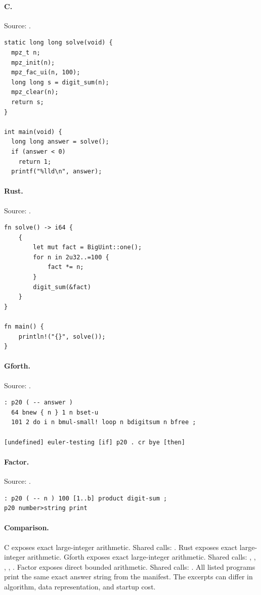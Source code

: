 \paragraph{C.} Source: .
\begin{lstlisting}
static long long solve(void) {
  mpz_t n;
  mpz_init(n);
  mpz_fac_ui(n, 100);
  long long s = digit_sum(n);
  mpz_clear(n);
  return s;
}

int main(void) {
  long long answer = solve();
  if (answer < 0)
    return 1;
  printf("%lld\n", answer);
\end{lstlisting}

\paragraph{Rust.} Source: .
\begin{lstlisting}
fn solve() -> i64 {
    {
        let mut fact = BigUint::one();
        for n in 2u32..=100 {
            fact *= n;
        }
        digit_sum(&fact)
    }
}

fn main() {
    println!("{}", solve());
}
\end{lstlisting}

\paragraph{Gforth.} Source: .
\begin{lstlisting}
: p20 ( -- answer )
  64 bnew { n } 1 n bset-u
  101 2 do i n bmul-small! loop n bdigitsum n bfree ;

[undefined] euler-testing [if] p20 . cr bye [then]
\end{lstlisting}

\paragraph{Factor.} Source: .
\begin{lstlisting}
: p20 ( -- n ) 100 [1..b] product digit-sum ;
p20 number>string print
\end{lstlisting}

\paragraph{Comparison.}
C exposes exact large-integer arithmetic. Shared calls: \texttt{}. Rust exposes exact large-integer arithmetic. Gforth exposes exact large-integer arithmetic. Shared calls: \texttt{}, \texttt{}, \texttt{}, \texttt{}, \texttt{}. Factor exposes direct bounded arithmetic. Shared calls: \texttt{}.
All listed programs print the same exact answer string from the manifest. The excerpts can differ in algorithm, data representation, and startup cost.

